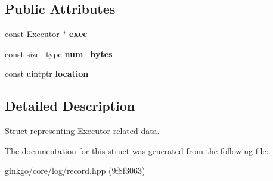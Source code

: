 \subsection*{Public Attributes}
\begin{DoxyCompactItemize}
\item 
\mbox{\label{structgko_1_1log_1_1executor__data_af2abfc8622da8be8466de15db9c15f82}} 
const \hyperlink{classgko_1_1Executor}{Executor} $\ast$ {\bfseries exec}
\item 
\mbox{\label{structgko_1_1log_1_1executor__data_ae163391b85c824367dd0c7e4771ac8c9}} 
const \hyperlink{namespacegko_a6e5c95df0ae4e47aab2f604a22d98ee7}{size\+\_\+type} {\bfseries num\+\_\+bytes}
\item 
\mbox{\label{structgko_1_1log_1_1executor__data_a5ff784e87bb40d732118a9bd77457ebe}} 
const uintptr {\bfseries location}
\end{DoxyCompactItemize}


\subsection{Detailed Description}
Struct representing \hyperlink{classgko_1_1Executor}{Executor} related data. 

The documentation for this struct was generated from the following file\+:\begin{DoxyCompactItemize}
\item 
ginkgo/core/log/record.\+hpp (9f8f3063)\end{DoxyCompactItemize}
